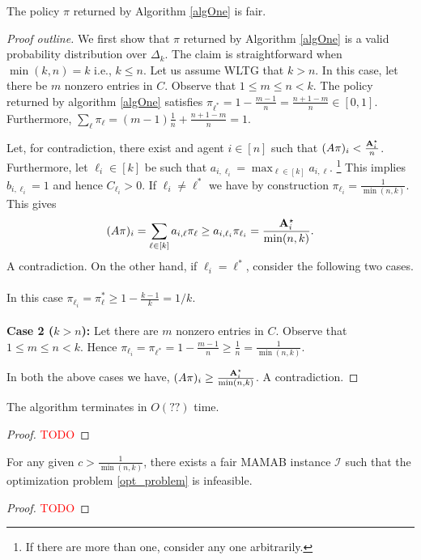 \begin{claim}
The policy $\pi$ returned by Algorithm \ref{algOne} is fair. 
\end{claim}
\begin{proof}[Proof outline]
We first show that $\pi$ returned by Algorithm \ref{algOne} is a valid probability distribution over $\Delta_k$. The claim is straightforward when $\min(k,n) = k$ i.e.,  $k\leq n$. Let us assume WLTG that $k>n$. In this case,  let there be $m$  nonzero entries in $C$. Observe that $1 \leq m \leq  n < k$. The policy returned by algorithm \ref{algOne} satisfies $\pi_{\ell^*} = 1 - \frac{m-1}{n} = \frac{n+1 - m}{n} \in [0,1]$. Furthermore, $ \sum_{\ell}\pi_\ell = (m-1) \frac{1}{n} + \frac{n+1 -m}{n} = 1 $. 

Let, for contradiction,  there exist and  agent $i \in [n]$ such that $(A\pi)_i  < \frac{ \mathbf{A}^{\star}_i}{n}$. Furthermore, let $\ell_i \in [k]$ be such that $a_{i, \ell_i} = \max_{\ell \in [k]} a_{i, \ell}$.  \footnote{If there are more than one, consider any one arbitrarily.} This implies $b_{i,\ell_i} =1$ and hence $C_{\ell_i} >0$. If $\ell_i \neq \ell^*$ we have by construction $\pi_{\ell_i} = \frac{1}{\min(n,k)}$. This gives 
$$(A\pi)_{i} = \sum_{\ell \in [k]} a_{i,\ell} \pi_{\ell} \geq a_{i,\ell_i} \pi_{\ell_i} = \frac{\mathbf{A}^{\star}_{i}}{\min(n,k)}.  $$ A contradiction. On the other hand, if $ \ell_i = \ell^*$, consider the following two cases. 
\\ \\ 
 In this case $ \pi_{\ell_i} =\pi_\ell^*  \geq 1 - \frac{k-1}{k} = 1/k $.  \\ \\ 
\noindent \textbf{Case 2 ($k > n$):} Let there are $m$  nonzero entries in $C$. Observe that $1 \leq m \leq  n < k$. Hence $\pi_{\ell_i} = \pi_{\ell^*} = 1 - \frac{m-1}{n} \geq   \frac{1}{n}  = \frac{1}{\min(n,k)}$. 

In both the above cases we have,  $(A\pi)_i \geq \frac{\mathbf{A}^{\star}_{i}}{\min(n,k)} $. A contradiction.
\end{proof}
\begin{claim}
The algorithm terminates in $O(??)$ time.  
\end{claim}
\begin{proof}
\textcolor{red}{TODO}
\end{proof}
\begin{lemma}
For any given $c > \frac{1}{\min(n,k)}$, there exists a fair { \sc MAMAB}  instance $\mathcal{I}$ such that the optimization problem \ref{opt_problem} is infeasible. 
\end{lemma}
\begin{proof}
\textcolor{red}{TODO}
\end{proof}

